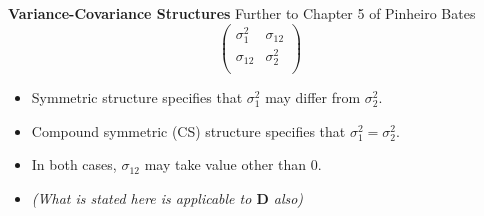 \documentclass[compress]{beamer}        %
\makeatletter
\newcommand{\tcb}{\textcolor{beamer@blendedblue}}
\makeatother
\begin{document}
		\begin{frame}{\bf \tcb{Variance-Covariance Structures}}
			Further to Chapter 5 of Pinheiro Bates
			\large
			\[\left(
			\begin{array}{cc}
			\sigma^2_1 & \sigma_{12}\\
			\sigma_{12} & \sigma^2_2\\
			\end{array} \right)
			\]
			\large
			\begin{itemize}\itemsep0.3cm
				
				\item Symmetric structure specifies that $\sigma^2_1$ may differ from $\sigma^2_2$.
				\item Compound symmetric (CS) structure specifies that $\sigma^2_1 = \sigma^2_2$.
				\item In both cases, $\sigma_{12}$ may take value other than 0.
				\item \textit{(What is stated here is applicable to $\boldsymbol{D}$ also)}
			\end{itemize}
			
		\end{frame}
\end{document}
